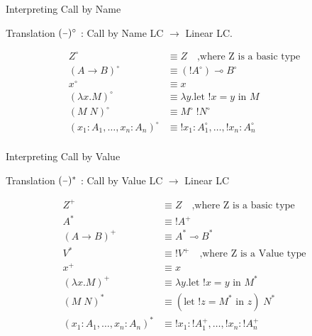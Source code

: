 \documentclass[10pt]{beamer}
\newcommand{\lam}[2]{\lambda #1 . #2}
\newcommand{\llet}[3]{\text{let }  ! #1 = #2 \text{ in } #3}
\newcommand{\app}[2]{#1 \; #2}
\newcommand{\minus}{\scalebox{0.75}[1.0]{$-$}}
\begin{document}
\begin{frame}[fragile]{Interpreting Call by Name}
  \begin{alertblock}{Translation}
    $(\minus)^\circ$ : Call by Name LC $\to$ Linear LC. \\
  \end{alertblock}

  \begin{align*}
    Z^\circ                             & \equiv Z \quad \text{,where Z is a basic type}     \\
    (A \rightarrow B)^\circ             & \equiv (! A^\circ) \multimap B^\circ               \\
    x^\circ                             & \equiv x                                           \\
    (\lam{x}{M})^\circ                  & \equiv \lam{y}{\llet{x}{y}{M}}                     \\
    (\app{M}{N})^\circ                  & \equiv \app{M^\circ}{! N^\circ}                    \\
    (x_1 : A_1, \dots, x_n : A_n)^\circ & \equiv ! x_1 : A_1^\circ, \dots, ! x_n : A_n^\circ \\
  \end{align*}

\end{frame}

\begin{frame}[fragile]{Interpreting Call by Value}
  \begin{alertblock}{Translation}
    $(\minus)^*$ : Call by Value LC $\to$ Linear LC\\
  \end{alertblock}

  \begin{align*}
    Z^+                             & \equiv Z \quad \text{,where Z is a basic type}     \\
    A^*                             & \equiv ! A^+                                       \\
    (A \rightarrow B)^+             & \equiv A^* \multimap B^*                           \\
    V^*                             & \equiv ! V^+ \quad \text{,where Z is a Value type} \\
    x^+                             & \equiv x                                           \\
    (\lam{x}{M})^+                  & \equiv \lam{y}{\llet{x}{y}{M^*}}                   \\
    (\app{M}{N})^*                  & \equiv \app{(\llet{z}{M^*}{z})}{N^*}               \\
    (x_1 : A_1, \dots, x_n : A_n)^* & \equiv ! x_1 : ! A_1^+, \dots, ! x_n : ! A_n^+     \\
  \end{align*}
\end{frame}
\end{document}
